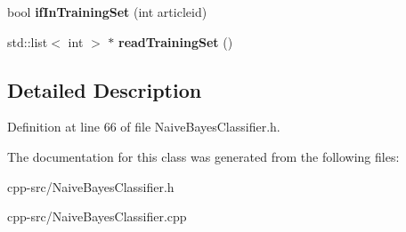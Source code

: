 \begin{DoxyCompactItemize}
\item 
\hypertarget{classNaiveBayesClassifier_a9b385ecda929247c9c3f4ac442dd3595}{bool {\bfseries if\-In\-Training\-Set} (int articleid)}\label{classNaiveBayesClassifier_a9b385ecda929247c9c3f4ac442dd3595}

\item 
\hypertarget{classNaiveBayesClassifier_a01e5ab5d7452a78ff73f109356a09684}{std\-::list$<$ int $>$ $\ast$ {\bfseries read\-Training\-Set} ()}\label{classNaiveBayesClassifier_a01e5ab5d7452a78ff73f109356a09684}

\end{DoxyCompactItemize}


\subsection{Detailed Description}


Definition at line 66 of file Naive\-Bayes\-Classifier.\-h.



The documentation for this class was generated from the following files\-:\begin{DoxyCompactItemize}
\item 
cpp-\/src/Naive\-Bayes\-Classifier.\-h\item 
cpp-\/src/Naive\-Bayes\-Classifier.\-cpp\end{DoxyCompactItemize}
